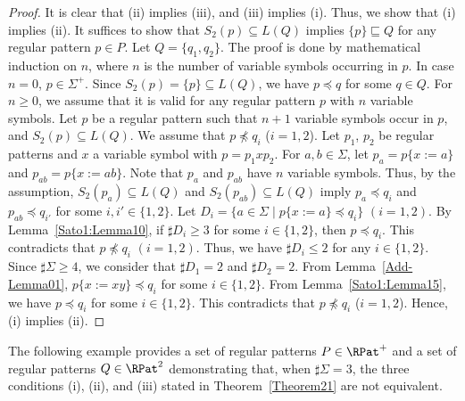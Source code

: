 \begin{proof}
    It is clear that (ii) implies (iii), and (iii) implies (i).
    Thus, we show that (i) implies (ii).
    It suffices to show that $S_{2}(p) \subseteq L(Q)$ implies {\color{black}$\{p\} \sqsubseteq Q$}
    for any regular pattern {\color{black}$p \in P$}.
    Let $Q = \{q_{1}, q_{2}\}$.
    The proof is done by mathematical induction on $n$,
    where $n$ is the number of variable symbols occurring in $p$.
    In case $n=0$, $p \in \Sigma^{+}$.
    Since $S_{2}(p) = \{p\} \subseteq L(Q)$, we have $p \preceq q$
    for some $q \in Q$.
    For $n \geq 0$, we assume that it is valid for any regular pattern $p$ with
    $n$ variable symbols.
    Let $p$ be a regular pattern such that $n+1$ variable symbols occur in $p$,
    and $S_{2}(p) \subseteq L(Q)$.
    We assume that $p \not\preceq q_{i}$ ($i=1,2$).
    Let $p_{1}$, $p_{2}$ be regular patterns and $x$ a variable symbol
    with $p = p_{1}xp_{2}$.
    For $a, b \in \Sigma$,
    let $p_{a} = p\{x:=a\}$ and $p_{ab} = p\{x:=ab\}$.
    Note that $p_{a}$ and $p_{ab}$ have $n$ variable symbols.
    Thus, by the assumption,
    $S_{2}(p_{a}) \subseteq L(Q)$ and $S_{2}(p_{ab}) \subseteq L(Q)$
    imply $p_{a} \preceq q_{i}$ and $p_{ab} \preceq q_{i'}$ for some
    $i, i' \in \{1,2\}$.
    Let $D_{i} = \{a \in \Sigma \mid p\{x:=a\} \preceq q_{i}\}$ $(i=1,2)$.
    By Lemma~\ref{Sato1:Lemma10},
    if $\sharp D_{i} \geq 3$ for some $i \in \{1,2\}$,
    then $p \preceq q_{i}$.
    This contradicts that $p \not\preceq q_{i}$ $(i=1,2)$.
    Thus, we have $\sharp D_{i} \leq 2$ for any $i \in \{1,2\}$.
    Since $\sharp \Sigma \geq 4$,
    we consider that $\sharp D_{1}=2$ and $\sharp D_{2} = 2$.
    From Lemma~\ref{Add-Lemma01},
    $p\{x:=xy\} \preceq q_{i}$ for some $i \in \{1,2\}$.
    From Lemma~\ref{Sato1:Lemma15}, 
    we have $p \preceq q_{i}$ for some $i \in \{1,2\}$.
    This contradicts that $p \not\preceq q_{i}$ ($i=1,2$).
    Hence, (i) implies (ii).
    \end{proof}

{\color{black} The following example provides a set of regular patterns $P \in \RPat^{+}$ and a set of regular patterns $Q \in \RPat^{2}$ demonstrating that, when $\sharp\Sigma = 3$, the three conditions (i), (ii), and (iii) stated in Theorem~\ref{Theorem21} are not equivalent.}


